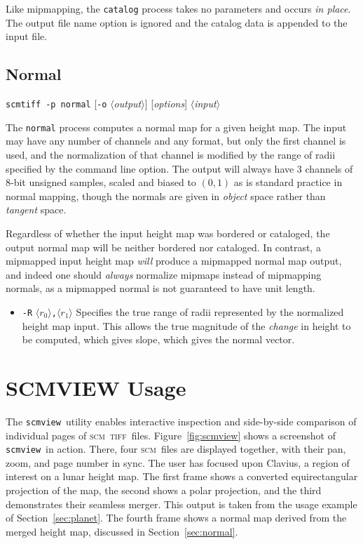 \documentclass[oneside,10pt]{memoir}
\newcommand{\scm}     {\textsc{scm}}
\newcommand{\tiff}    {\textsc{tiff}}
\newcommand{\scmtiff} {\texttt{scmtiff}}
\newcommand{\scmview} {\texttt{scmview}}
\newcommand{\inangles}[1]{$\langle$#1$\rangle$}
\newenvironment{optionlist}
  {\setlength{\leftmargini}{1in}\begin{itemize}}{\end{itemize}}
\begin{document}
\begin{Spacing}{1.1}
Like mipmapping, the \texttt{catalog} process takes no parameters and occurs \emph{in place}. The output file name option is ignored and the catalog data is appended to the input file.

\subsection{Normal}

\noindent\scmtiff\ \texttt{-p normal} [\texttt{-o} \inangles{\textit{output}}] [\textit{options}] \inangles{\textit{input}}

\bigskip The \texttt{normal} process computes a normal map for a given height map. The input may have any number of channels and any format, but only the first channel is used, and the normalization of that channel is modified by the range of radii specified by the command line option. The output will always have 3 channels of 8-bit unsigned samples, scaled and biased to $(0,1)$ as is standard practice in normal mapping, though the normals are given in \emph{object} space rather than \emph{tangent} space.

Regardless of whether the input height map was bordered or cataloged, the output normal map will be neither bordered nor cataloged. In contrast, a mipmapped input height map \emph{will} produce a mipmapped normal map output, and indeed one should \emph{always} normalize mipmaps instead of mipmapping normals, as a mipmapped normal is not guaranteed to have unit length.

\begin{optionlist}
\item[\texttt{-R} \inangles{$r_0$}\texttt{,}\inangles{$r_1$}] Specifies the true range of radii represented by the normalized height map input. This allows the true magnitude of the \emph{change} in height to be computed, which gives slope, which gives the normal vector.
\end{optionlist}

\section{SCMVIEW Usage}

The \scmview\ utility enables interactive inspection and side-by-side comparison of individual pages of \scm\ \tiff\ files. Figure~\ref{fig:scmview} shows a screenshot of \scmview\ in action. There, four \scm\ files are displayed together, with their pan, zoom, and page number in sync. The user has focused upon Clavius, a region of interest on a lunar height map. The first frame shows a converted equirectangular projection of the map, the second shows a polar projection, and the third demonstrates their seamless merger. This output is taken from the usage example of Section~\ref{sec:planet}. The fourth frame shows a normal map derived from the merged height map, discussed in Section~\ref{sec:normal}.


\end{Spacing}
\end{document}
